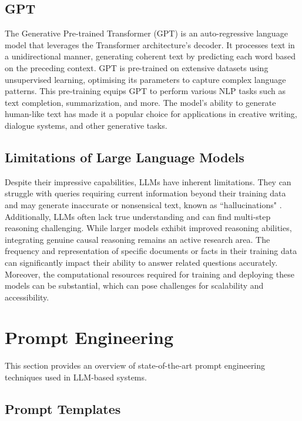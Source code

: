 \subsection{GPT}

The Generative Pre-trained Transformer (GPT) \cite{radford2018improving} is an auto-regressive language model that leverages the Transformer architecture's decoder. It processes text in a unidirectional manner, generating coherent text by predicting each word based on the preceding context. GPT is pre-trained on extensive datasets using unsupervised learning, optimising its parameters to capture complex language patterns. This pre-training equips GPT to perform various NLP tasks such as text completion, summarization, and more. The model's ability to generate human-like text has made it a popular choice for applications in creative writing, dialogue systems, and other generative tasks.

\subsection{Limitations of Large Language Models}

Despite their impressive capabilities, LLMs have inherent limitations. They can struggle with queries requiring current information beyond their training data and may generate inaccurate or nonsensical text, known as ``hallucinations" \cite{zhang2023siren}. Additionally, LLMs often lack true understanding and can find multi-step reasoning challenging. While larger models exhibit improved reasoning abilities, integrating genuine causal reasoning remains an active research area. The frequency and representation of specific documents or facts in their training data can significantly impact their ability to answer related questions accurately. Moreover, the computational resources required for training and deploying these models can be substantial, which can pose challenges for scalability and accessibility.


\section{Prompt Engineering}

This section provides an overview of state-of-the-art prompt engineering techniques used in LLM-based systems.

\subsection{Prompt Templates}

